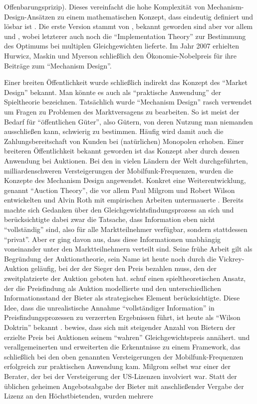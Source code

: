 Offenbarungsprizip). Dieses vereinfacht die hohe Komplexität von Mechanism-Design-Ansätzen zu einem mathematischen Konzept, dass eindeutig definiert und lösbar ist \parencite[S. 3]{Nobelpreis-Komitee2007}. Die erste Version stammt von \textcite{Gibbard1973}, bekannt geworden sind aber vor allem \textcite{Myerson1979} und \textcite{Maskin1979}, wobei letzterer auch noch die "`Implementation Theory"' zur Bestimmung des Optimums bei multiplen Gleichgewichten lieferte. Im Jahr 2007 erhielten Hurwicz, Maskin und Myerson schließlich den Ökonomie-Nobelpreis für ihre Beiträge zum "`Mechanism Design"'.

Einer breiten Öffentlichkeit wurde schließlich indirekt das Konzept des "`Market Design"' bekannt. Man könnte es auch als "`praktische Anwendung"' der Spieltheorie bezeichnen. Tatsächlich wurde "`Mechanism Design"' rasch verwendet um Fragen zu Problemen des Marktversagens zu bearbeiten. So ist meist der Bedarf für "`öffentlichen Güter"', also Gütern, von deren Nutzung man niemanden ausschließen kann, schwierig zu bestimmen. Häufig wird damit auch die Zahlungsbereitschaft von Kunden bei (natürlichen) Monopolen erhoben. Einer breiteren Öffentlichkeit bekannt geworden ist das Konzept aber durch dessen Anwendung bei Auktionen. Bei den in vielen Ländern der Welt durchgeführten, milliardenschweren Versteigerungen der Mobilfunk-Frequenzen, wurden die Konzepte des Mechanism Design angewendet. Konkret eine Weiterentwicklung, genannt "`Auction Theory"', die vor allem Paul Milgrom und Robert Wilson entwickelten und Alvin Roth mit empirischen Arbeiten untermauerte \parencite{Roth2019}. Bereits \textcite{Vickrey1961} machte sich Gedanken über den Gleichgewichtsfindungsprozess an sich und berücksichtigte dabei zwar die Tatsache, dass Information eben nicht "`vollständig"' sind, also für alle Marktteilnehmer verfügbar, sondern stattdessen "`privat"'. Aber er ging davon aus, dass diese Informationen unabhängig voneinander unter den Marktteilnehmern verteilt sind. Seine frühe Arbeit \parencite{Vickrey1961} gilt als Begründung der Auktionstheorie, sein Name ist heute noch durch die Vickrey-Auktion geläufig, bei der der Sieger den Preis bezahlen muss, den der zweitplatzierte der Auktion geboten hat. \textcite{Wilson1967, Wilson1969} schuf einen spieltheoretischen Ansatz, der die Preisfindung als Auktion modellierte und den unterschiedlichen Informationsstand der Bieter als strategisches Element berücksichtigte. Diese Idee, dass die unrealistische Annahme "`vollständiger Information"' in Preisfindungsprozessen zu verzerrten Ergebnissen führt, ist heute als "`Wilson Doktrin"' bekannt \parencite{Roth2019}. \textcite{Wilson1977} bewies, dass sich mit steigender Anzahl von Bietern der erzielte Preis bei Auktionen seinem "`wahren"' Gleichgewichtspreis annähert. \textcite{Milgrom1979, Milgrom1981} und \textcite{Milgrom1982} verallgemeinerten und erweiterten die Erkenntnisse zu einem Framework, das schließlich bei den oben genannten Versteigerungen der Mobilfunk-Frequenzen erfolgreich zur praktischen Anwendung kam. Milgrom selbst war einer der Berater, der bei der Versteigerung der US-Lizenzen involviert war. Statt der üblichen geheimen Angebotsabgabe der Bieter mit anschließender Vergabe der Lizenz an den Höchstbietenden, wurden mehrere 